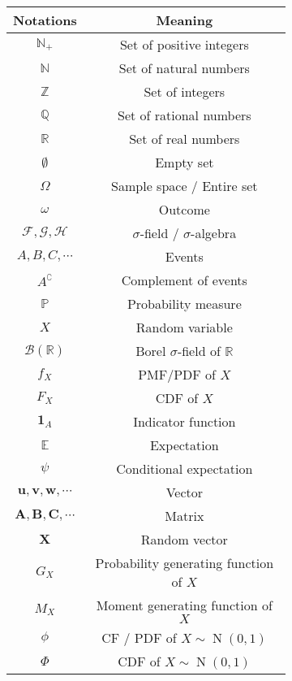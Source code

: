 \documentclass{huhtakm-template-book}
\newcommand{\prob}{\mathbb{P}}
\DeclareMathOperator{\N}{N}
\begin{document}
\begin{figure}[h]
    \begin{subfigure}{0.45\textwidth}
        \centering
        \begin{tabular}{cc}
            Notations & Meaning\\
            \hline
            $\mathbb{N}_{+}$ & Set of positive integers\\
            $\mathbb{N}$ & Set of natural numbers\\
            $\mathbb{Z}$ & Set of integers\\
            $\mathbb{Q}$ & Set of rational numbers\\
            $\mathbb{R}$ & Set of real numbers\\
            $\emptyset$ & Empty set\\
            $\Omega$ & Sample space / Entire set\\
            $\omega$ & Outcome\\
            $\mathcal{F},\mathcal{G},\mathcal{H}$ & $\sigma$-field / $\sigma$-algebra\\
            $A,B,C,\cdots$ & Events\\
            $A^{\complement}$ & Complement of events\\
            $\prob$ & Probability measure\\
            $X$ & Random variable\\
            $\mathcal{B}(\mathbb{R})$ & Borel $\sigma$-field of $\mathbb{R}$ \\
            $f_{X}$ & PMF/PDF of $X$\\
            $F_{X}$ & CDF of $X$\\
            $\mathbf{1}_{A}$ & Indicator function\\
            $\mathbb{E}$ & Expectation\\
            $\psi$ & Conditional expectation\\
			$\mathbf{u},\mathbf{v},\mathbf{w},\cdots$ & Vector\\
            $\mathbf{A},\mathbf{B},\mathbf{C},\cdots$ & Matrix\\
            $\mathbf{X}$ & Random vector\\
            $G_{X}$ & Probability generating function of $X$\\
            $M_{X}$ & Moment generating function of $X$\\
            $\phi$ & CF / PDF of $X\sim\N(0,1)$\\
            $\Phi$ & CDF of $X\sim\N(0,1)$

\end{tabular}
\end{subfigure}
\end{figure}
\end{document}
